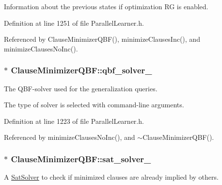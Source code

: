 Information about the previous states if optimization R\-G is enabled. 



Definition at line 1251 of file Parallel\-Learner.\-h.



Referenced by Clause\-Minimizer\-Q\-B\-F(), minimize\-Clauses\-Inc(), and minimize\-Clauses\-No\-Inc().

\hypertarget{classClauseMinimizerQBF_abca59a55100d8667effffdd26da5c7f7}{
\subsubsection[{qbf\-\_\-solver\-\_\-}]{$\ast$ Clause\-Minimizer\-Q\-B\-F\-::qbf\-\_\-solver\-\_\-\hspace{0.3cm}{\ttfamily [protected]}}}\label{classClauseMinimizerQBF_abca59a55100d8667effffdd26da5c7f7}


The Q\-B\-F-\/solver used for the generalization queries. 

The type of solver is selected with command-\/line arguments. 

Definition at line 1223 of file Parallel\-Learner.\-h.



Referenced by minimize\-Clauses\-No\-Inc(), and $\sim$\-Clause\-Minimizer\-Q\-B\-F().

\hypertarget{classClauseMinimizerQBF_af0b9ee5117475b01e377f730fba6d4fb}{
\subsubsection[{sat\-\_\-solver\-\_\-}]{$\ast$ Clause\-Minimizer\-Q\-B\-F\-::sat\-\_\-solver\-\_\-\hspace{0.3cm}{\ttfamily [protected]}}}\label{classClauseMinimizerQBF_af0b9ee5117475b01e377f730fba6d4fb}


A \hyperlink{classSatSolver}{Sat\-Solver} to check if minimized clauses are already implied by others. 



